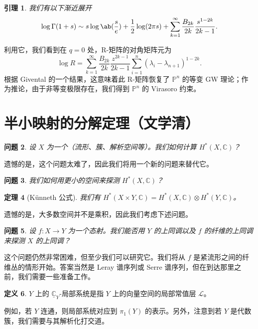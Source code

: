 \documentclass{amsart}
\newtheorem{thm}{定理}[section]
\newtheorem{lem}[thm]{引理}
\newtheorem{quest}[thm]{问题}
\theoremstyle{definition}
\newtheorem{defn}[thm]{定义}
\theoremstyle{remark}
\theoremstyle{plain}
\theoremstyle{definition}
\theoremstyle{remark}
\newcommand{\C}{\mathbb{C}}
\renewcommand{\P}{\mathbb{P}}
\newcommand{\mc}[1]{\mathcal{#1}}
\newcommand{\ul}[1]{\underline{#1}}
\newcommand{\1}{\mathbf{1}}
\newcommand{\2}{\mathbf{2}}
\newcommand{\3}{\mathbf{3}}
\begin{document}
\begin{lem}
    我们有以下渐近展开
    \[ \log \Gamma(1+s) \sim s \log \ab(\frac{s}{e}) + \frac{1}{2} \log(2\pi s) + \sum_{k=1}^{\infty} \frac{B_{2k}}{2k} \frac{s^{1-2k}}{2k-1}. \]
\end{lem}
利用它，我们看到在 \(q = 0\) 处，R-矩阵的对角矩阵元为
\[ \log R = \sum_{k=1}^{\infty} \frac{B_{2k}}{2k} \frac{z^{2k-1}}{2k-1} \sum_{i =1}^n (\lambda_i - \lambda_{n+1})^{1-2k}. \]
根据 Givental 的一个结果，这意味着此 R-矩阵恢复了 \(\P^n\) 的等变 GW 理论；作为推论，由于非等变极限存在，我们得到 \(\P^n\) 的 Virasoro 约束。
\section{半小映射的分解定理（文学清）}%
\label{sec:Decomposition theorem for semi-small maps (Xueqing Wen)}

\begin{quest}
    设 \(X\) 为一个（流形、簇、解析空间等）。我们如何计算 \(H^*(X, \C)\)？
\end{quest}

遗憾的是，这个问题太难了，因此我们将用一个新的问题来替代它。

\begin{quest}
    我们如何用更小的空间来探测 \(H^*(X, \C)\)？
\end{quest}

\begin{thm}[K\"unneth 公式]
    我们有 \(H^*(X \times Y, \C) = H^*(X, \C) \otimes H^*(Y, \C)\)。
\end{thm}

遗憾的是，大多数空间并不是乘积，因此我们考虑下述问题。

\begin{quest}
    设 \(f \colon X \to Y\) 为一个态射。我们能否用 \(Y\) 的上同调以及 \(f\) 的纤维的上同调来探测 \(X\) 的上同调？
\end{quest}

这个问题仍然非常困难，但至少我们可以研究它。我们将从 \(f\) 是紧流形之间的纤维丛的情形开始。答案当然是 Leray 谱序列或 Serre 谱序列，但在到达那里之前，我们需要一些准备工作。

\begin{defn}
    \(Y\) 上的 \(\ul{\C}_Y\)-局部系统是指 \(Y\) 上的向量空间的局部常值层 \(\mc{L}\)。
\end{defn}

例如，若 \(Y\) 连通，则局部系统对应到 \(\pi_1(Y)\) 的表示。另外，注意到若 \(Y\) 是代数簇，我们需要与其解析化打交道。
\end{document}
